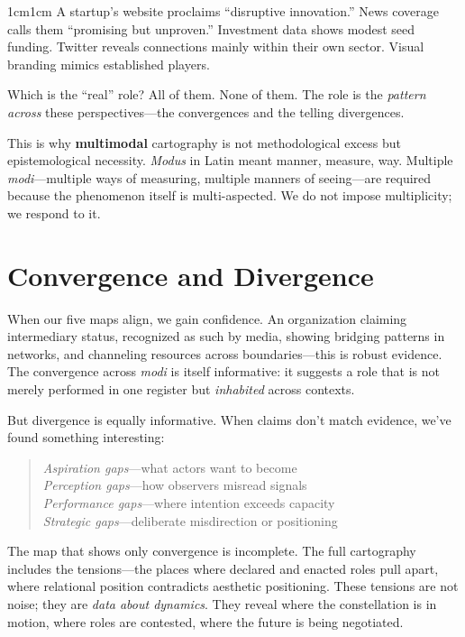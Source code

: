 \documentclass[../main.tex]{subfiles}
\begin{document}
\begin{adjustwidth}{1cm}{1cm}
A startup's website proclaims ``disruptive innovation.'' News coverage calls them ``promising but unproven.'' Investment data shows modest seed funding. Twitter reveals connections mainly within their own sector. Visual branding mimics established players.

Which is the ``real'' role? All of them. None of them. The role is the \textit{pattern across} these perspectives---the convergences and the telling divergences.

This is why \textbf{multimodal} cartography is not methodological excess but epistemological necessity. \textit{Modus} in Latin meant manner, measure, way. Multiple \textit{modi}---multiple ways of measuring, multiple manners of seeing---are required because the phenomenon itself is multi-aspected. We do not impose multiplicity; we respond to it.

\vspace{0.8cm}

\section*{Convergence and Divergence}

When our five maps align, we gain confidence. An organization claiming intermediary status, recognized as such by media, showing bridging patterns in networks, and channeling resources across boundaries---this is robust evidence. The convergence across \textit{modi} is itself informative: it suggests a role that is not merely performed in one register but \textit{inhabited} across contexts.

But divergence is equally informative. When claims don't match evidence, we've found something interesting:

\begin{quote}
\textit{Aspiration gaps}---what actors want to become\\
\textit{Perception gaps}---how observers misread signals\\
\textit{Performance gaps}---where intention exceeds capacity\\
\textit{Strategic gaps}---deliberate misdirection or positioning
\end{quote}

The map that shows only convergence is incomplete. The full cartography includes the tensions---the places where declared and enacted roles pull apart, where relational position contradicts aesthetic positioning. These tensions are not noise; they are \textit{data about dynamics}. They reveal where the constellation is in motion, where roles are contested, where the future is being negotiated.


\end{adjustwidth}
\end{document}
